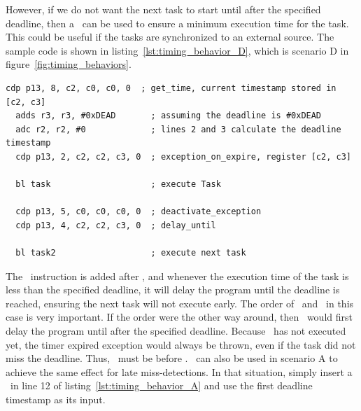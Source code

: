 However, if we do not want the next task to start until after the specified deadline, then a \delayuntil\ can be used to ensure a minimum execution time for the task.
This could be useful if the tasks are synchronized to an external source.   
The sample code is shown in listing~\ref{lst:timing_behavior_D}, which is scenario D in figure~\ref{fig:timing_behaviors}.
\vspace{-4mm}
\begin{lstlisting}[float=h, label=lst:timing_behavior_D,caption=Assembly code to implement scenario D]
  cdp p13, 8, c2, c0, c0, 0  ; get_time, current timestamp stored in [c2, c3]
  adds r3, r3, #0xDEAD       ; assuming the deadline is #0xDEAD
  adc r2, r2, #0             ; lines 2 and 3 calculate the deadline timestamp
  cdp p13, 2, c2, c2, c3, 0  ; exception_on_expire, register [c2, c3]
   
  bl task                    ; execute Task
  
  cdp p13, 5, c0, c0, c0, 0  ; deactivate_exception
  cdp p13, 4, c2, c2, c3, 0  ; delay_until 
     
  bl task2                   ; execute next task
\end{lstlisting}
\vspace{-2mm}

The \delayuntil\ instruction is added after \deactivateexception, and whenever the execution time of the task is less than the specified deadline, it will delay the program until the deadline is reached, ensuring the next task will not execute early.
The order of \delayuntil\ and \deactivateexception\ in this case is very important. 
If the order were the other way around, then \delayuntil\ would first delay the program until after the specified deadline. 
Because \deactivateexception\ has not executed yet, the timer expired exception would always be thrown, even if the task did not miss the deadline.
Thus, \deactivateexception\ must be before \delayuntil.
\Delayuntil\ can also be used in scenario A to achieve the same effect for late miss-detections. 
In that situation, simply insert a \delayuntil\ in line 12 of listing~\ref{lst:timing_behavior_A} and use the first deadline timestamp as its input.    
 

